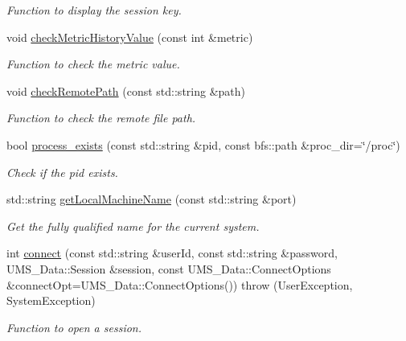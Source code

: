 \begin{DoxyCompactItemize}
\begin{DoxyCompactList}\small\item\em Function to display the session key. \item\end{DoxyCompactList}\item 
void \hyperlink{namespacevishnu_a7671a1a0faa2417f4224a68879979bc4}{checkMetricHistoryValue} (const int \&metric)
\begin{DoxyCompactList}\small\item\em Function to check the metric value. \item\end{DoxyCompactList}\item 
void \hyperlink{namespacevishnu_a3b238cf04a86c821f8a267afad489bee}{checkRemotePath} (const std::string \&path)
\begin{DoxyCompactList}\small\item\em Function to check the remote file path. \item\end{DoxyCompactList}\item 
bool \hyperlink{namespacevishnu_a04f9a9dfc61b7390150222b10f64bb70}{process\_\-exists} (const std::string \&pid, const bfs::path \&proc\_\-dir=\char`\"{}/proc\char`\"{})
\begin{DoxyCompactList}\small\item\em Check if the pid exists. \item\end{DoxyCompactList}\item 
std::string \hyperlink{namespacevishnu_a7d9cd0241f290039aff6a6410b1cc22f}{getLocalMachineName} (const std::string \&port)
\begin{DoxyCompactList}\small\item\em Get the fully qualified name for the current system. \item\end{DoxyCompactList}\item 
int \hyperlink{namespacevishnu_ac58b058a6a467a21f7eb21192617c90f}{connect} (const std::string \&userId, const std::string \&password, UMS\_\-Data::Session \&session, const UMS\_\-Data::ConnectOptions \&connectOpt=UMS\_\-Data::ConnectOptions())  throw (UserException, SystemException)
\begin{DoxyCompactList}\small\item\em Function to open a session. \item\end{DoxyCompactList}\item 

\end{DoxyCompactItemize}
